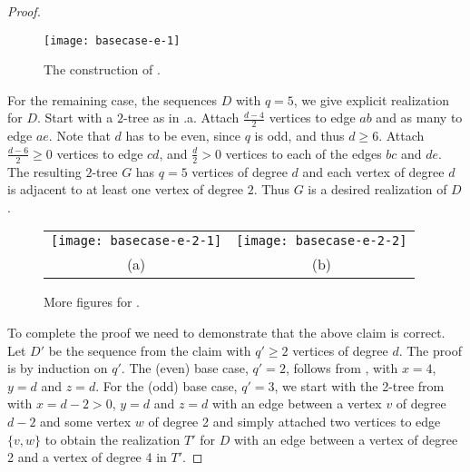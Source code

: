 \documentclass[lotsofwhite,charterfonts]{patmorin}
\begin{document}
\begin{proof}
\begin{figure} \begin{center}
\texttt{[image: basecase-e-1]} \end{center} \caption{The
construction of .} 
\end{figure}

For the remaining case, the sequences $D$ with $q=5$, we give explicit
realization for $D$. Start with a $2$-tree as in
.a. Attach
$\frac{d-4}{2}$ vertices to edge $ab$ and as many to edge $ae$. Note
that $d$ has to be even, since $q$ is odd, and thus $d\geq 6$. Attach
$\frac{d-6}{2}\geq 0$ vertices to edge $cd$, and $\frac{d}{2}>0$
vertices to each of the edges $bc$ and $de$. The resulting $2$-tree
$G$ has $q=5$ vertices of degree $d$ and each vertex of degree $d$ is
adjacent to at least one vertex of degree $2$. Thus $G$ is a desired
realization of $D$.
\begin{figure}
\begin{center}\begin{tabular}{cc}
\texttt{[image: basecase-e-2-1]} &
\texttt{[image: basecase-e-2-2]} \\
(a) & (b) 
\end{tabular}\end{center}
\caption{More figures for .}
\end{figure}

To complete the proof we need to demonstrate that the above claim is
correct. Let $D'$ be the sequence from the claim with $q'\geq 2$
vertices of degree $d$. The proof is by induction on $q'$. The (even)
base case, $q'=2$, follows from , with $x=4$, $y=d$
and $z=d$. For the (odd) base case, $q'=3$, we start with the 2-tree
from   with $x=d-2>0$, $y=d$ and $z=d$ with an edge
between a vertex $v$ of degree $d-2$ and some vertex $w$ of degree 2
and simply attached two vertices to edge $\{v,w\}$ to obtain the
realization $T'$ for $D$ with an edge between a vertex of degree 2 and
a vertex of degree 4 in $T'$.


\end{proof}
\end{document}
